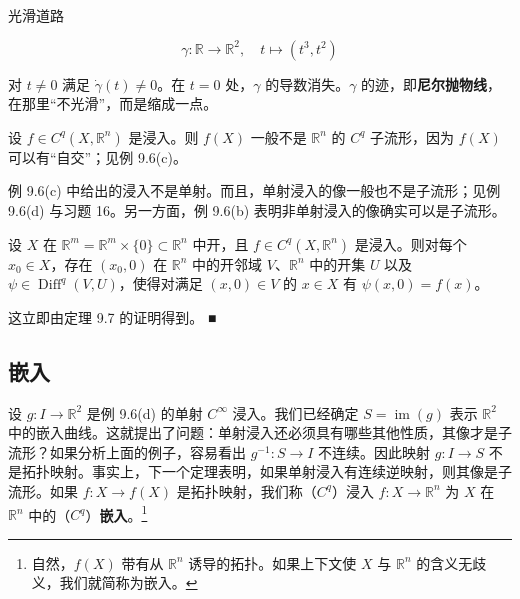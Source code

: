 \begin{remark}

\begin{items}
\item

光滑道路

\[
\gamma : \mathbb{R} \to \mathbb{R}^{2} , \quad t \mapsto (t^{3}, t^{2})
\]

对 $ t \ne 0 $ 满足 $ \dot{\gamma}(t) \ne 0 $。在 $ t = 0 $ 处，$ \gamma $ 的导数消失。$ \gamma $ 的迹，即\textbf{尼尔抛物线}，在那里“不光滑”，而是缩成一点。

\end{items}


\begin{items}
\item[（b）]

设 $ f \in C^{q}(X, \mathbb{R}^{n}) $ 是浸入。则 $ f(X) $ 一般不是 $ \mathbb{R}^{n} $ 的 $ C^{q} $ 子流形，因为 $ f(X) $ 可以有“自交”；见例 9.6(c)。

\item[（c）]

例 9.6(c) 中给出的浸入不是单射。而且，单射浸入的像一般也不是子流形；见例 9.6(d) 与习题 16。另一方面，例 9.6(b) 表明非单射浸入的像确实可以是子流形。

\item[（d）]

设 $ X $ 在 $ \mathbb{R}^{m} = \mathbb{R}^{m} \times \{0\} \subset \mathbb{R}^{n} $ 中开，且 $ f \in C^{q}(X, \mathbb{R}^{n}) $ 是浸入。则对每个 $ x_{0} \in X $，存在 $ (x_{0}, 0) $ 在
$ \mathbb{R}^{n} $ 中的开邻域 $ V $、$ \mathbb{R}^{n} $ 中的开集 $ U $ 以及 $ \psi \in \operatorname{Diff}^{q}(V, U) $，使得对满足 $ (x, 0) \in V $ 的 $ x \in X $ 有 $ \psi(x, 0) = f(x) $。

\proofhead
这立即由定理 9.7 的证明得到。 \nobreak\hspace{0.35em}■
\end{items}

\end{remark}

\subsection*{嵌入}

设 $ g : I \to \mathbb{R}^{2} $ 是例 9.6(d) 的单射 $ C^{\infty} $ 浸入。我们已经确定 $ S = \operatorname{im}(g) $ 表示 $ \mathbb{R}^{2} $ 中的嵌入曲线。这就提出了问题：单射浸入还必须具有哪些其他性质，其像才是子流形？如果分析上面的例子，容易看出 $ g^{-1} : S \to I $ 不连续。因此映射 $ g : I \to S $ 不是拓扑映射。事实上，下一个定理表明，如果单射浸入有连续逆映射，则其像是子流形。如果 $ f : X \to f(X) $ 是拓扑映射，我们称（$ C^{q} $）浸入 $ f : X \to \mathbb{R}^{n} $ 为 $ X $ 在 $ \mathbb{R}^{n} $ 中的（$ C^{q} $）\textbf{嵌入}。\footnote{自然，$ f(X) $ 带有从 $ \mathbb{R}^{n} $ 诱导的拓扑。如果上下文使 $ X $ 与 $ \mathbb{R}^{n} $ 的含义无歧义，我们就简称为嵌入。}


